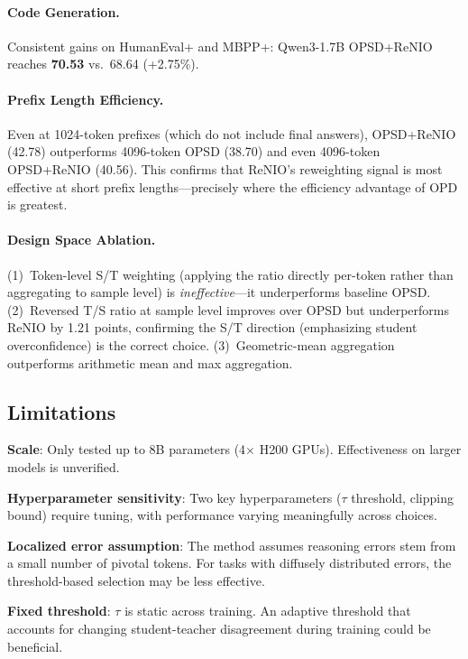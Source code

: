 \documentclass[11pt,a4paper]{article}
\begin{document}
\paragraph{Code Generation.} Consistent gains on HumanEval+ and MBPP+: Qwen3-1.7B OPSD+ReNIO reaches \textbf{70.53} vs.\ 68.64 (+2.75\%).

\paragraph{Prefix Length Efficiency.} Even at 1024-token prefixes (which do not include final answers), OPSD+ReNIO (42.78) outperforms 4096-token OPSD (38.70) and even 4096-token OPSD+ReNIO (40.56). This confirms that ReNIO's reweighting signal is most effective at short prefix lengths---precisely where the efficiency advantage of OPD is greatest.

\paragraph{Design Space Ablation.} (1)~Token-level S/T weighting (applying the ratio directly per-token rather than aggregating to sample level) is \emph{ineffective}---it underperforms baseline OPSD. (2)~Reversed T/S ratio at sample level improves over OPSD but underperforms ReNIO by 1.21 points, confirming the S/T direction (emphasizing student overconfidence) is the correct choice. (3)~Geometric-mean aggregation outperforms arithmetic mean and max aggregation.

\subsection{Limitations}

\textbf{Scale}: Only tested up to 8B parameters (4$\times$ H200 GPUs). Effectiveness on larger models is unverified.

\textbf{Hyperparameter sensitivity}: Two key hyperparameters ($\tau$ threshold, clipping bound) require tuning, with performance varying meaningfully across choices.

\textbf{Localized error assumption}: The method assumes reasoning errors stem from a small number of pivotal tokens. For tasks with diffusely distributed errors, the threshold-based selection may be less effective.

\textbf{Fixed threshold}: $\tau$ is static across training. An adaptive threshold that accounts for changing student-teacher disagreement during training could be beneficial.
\end{document}
